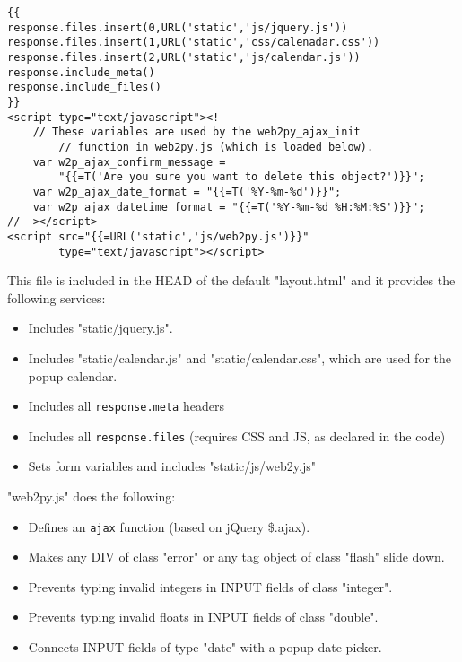 \documentclass[justified,sixbynine,notoc]{tufte-book}
\def\ft{\small\tt}
\begin{document}
\begin{fullwidth}
\begin{lstlisting}[keywords={}]
{{
response.files.insert(0,URL('static','js/jquery.js'))
response.files.insert(1,URL('static','css/calenadar.css'))
response.files.insert(2,URL('static','js/calendar.js'))
response.include_meta()
response.include_files()
}}
<script type="text/javascript"><!--
    // These variables are used by the web2py_ajax_init
        // function in web2py.js (which is loaded below).
    var w2p_ajax_confirm_message =
        "{{=T('Are you sure you want to delete this object?')}}";
    var w2p_ajax_date_format = "{{=T('%Y-%m-%d')}}";
    var w2p_ajax_datetime_format = "{{=T('%Y-%m-%d %H:%M:%S')}}";
//--></script>
<script src="{{=URL('static','js/web2py.js')}}"
        type="text/javascript"></script>
\end{lstlisting}

This file is included in the HEAD of the default "layout.html" and it provides the following services:
\begin{itemize}
\item Includes "static/jquery.js".

\item Includes "static/calendar.js" and "static/calendar.css", which are used for the popup calendar.

\item Includes all {\ft response.meta} headers

\item Includes all {\ft response.files} (requires CSS and JS, as declared in the code)

\item Sets form variables and includes "static/js/web2y.js"
\end{itemize}

"web2py.js" does the following:
\begin{itemize}
\item Defines an {\ft ajax} function (based on jQuery \$.ajax).

\item Makes any DIV of class "error" or any tag object of class "flash" slide down.

\item Prevents typing invalid integers in INPUT fields of class "integer".

\item Prevents typing invalid floats in INPUT fields of class "double".

\item Connects INPUT fields of type "date" with a popup date picker.


\end{itemize}
\end{fullwidth}
\end{document}
